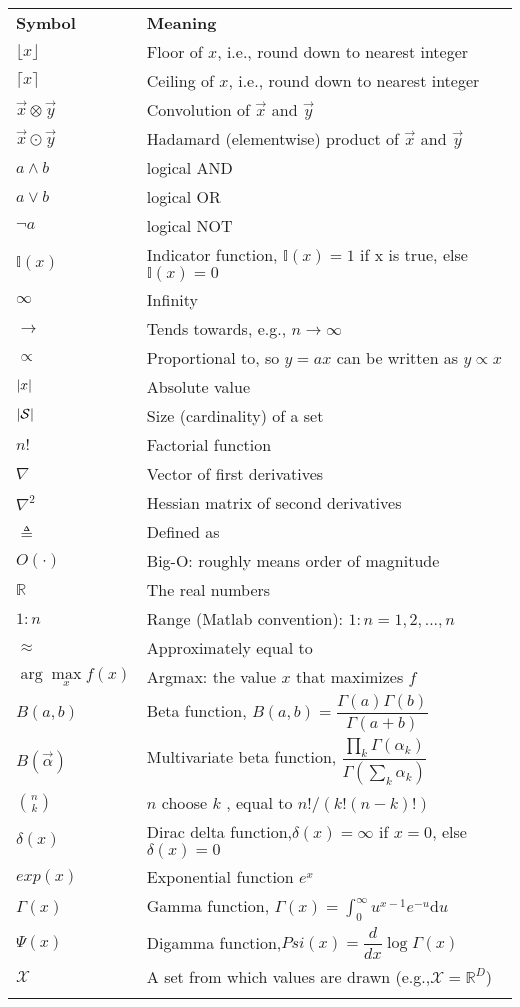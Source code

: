 \begin{longtable}{ll}
\hline\noalign{\smallskip}
\textbf{Symbol} & \textbf{Meaning} \\
\noalign{\smallskip}\hline\noalign{\smallskip}
$\lfloor x \rfloor$ & Floor of $x$, i.e., round down to nearest integer\\
$\lceil x \rceil$ & Ceiling of $x$, i.e., round down to nearest integer\\
$\vec{x} \otimes \vec{y}$ & Convolution of $\vec{x}$ and $\vec{y}$\\
$\vec{x} \odot \vec{y}$ & Hadamard (elementwise) product of $\vec{x}$ and $\vec{y}$\\
$a \wedge b$ & logical AND\\
$a \vee b$ & logical OR\\
$\neg a$ & logical NOT\\
$\mathbb{I}(x)$ & Indicator function, $\mathbb{I}(x)=1$ if x is true, else $\mathbb{I}(x)=0$\\
$\infty$ & Infinity\\
$\rightarrow$ & Tends towards, e.g., $n \rightarrow \infty$\\
$\propto$ &Proportional to, so $y = ax$ can be written as $y \propto x$\\
$\left\lvert x\right\rvert$ & Absolute value\\
$\left\lvert\mathcal{S}\right\rvert$ & Size (cardinality) of a set\\
$n!$ & Factorial function\\
$\nabla$ & Vector of first derivatives\\
$\nabla^2$ & Hessian matrix of second derivatives\\
$\triangleq$ & Defined as\\
$O(\cdot)$ & Big-O: roughly means order of magnitude\\
$\mathbb{R}$ & The real numbers\\
$1:n$ & Range (Matlab convention): $1:n = {1, 2,...,n}$\\
$\approx$ & Approximately equal to\\
$\arg\max\limits_x f(x)$ & Argmax: the value $x$ that maximizes $f$\\
$B(a,b)$ & Beta function, $B(a,b)=\dfrac{\Gamma(a)\Gamma(b)}{\Gamma(a+b)}$\\
$B(\vec{\alpha})$ & Multivariate beta function, $\dfrac{\prod\limits_k \Gamma(\alpha_k)}{\Gamma(\sum\limits_k \alpha_k)}$\\
$\binom{n}{k}$ & $n$ choose $k$ , equal to $n!/(k!(n−k )!)$\\
$\delta(x)$ & Dirac delta function,$\delta(x)=\infty$ if $x=0$, else $\delta(x)=0$\\
$exp(x)$ & Exponential function $e^x$\\
$\Gamma(x)$ & Gamma function, $\Gamma(x)=\int_0^\infty u^{x-1}e^{-u}\mathrm{d}u$\\
$\Psi(x)$ &  Digamma function,$Psi(x)=\dfrac{d}{dx}\log\Gamma(x)$\\
$\mathcal{X}$ & A set from which values are drawn (e.g.,$\mathcal{X}=\mathbb{R}^D$)\\
\noalign{\smallskip}\hline\noalign{\smallskip}
\end{longtable}


